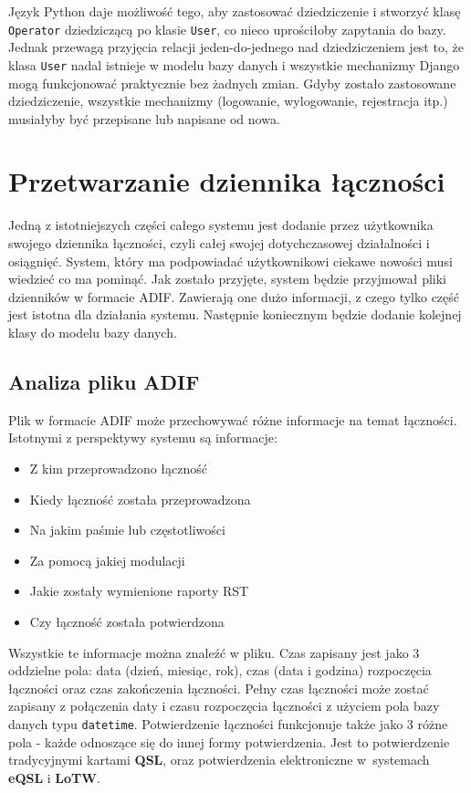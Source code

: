 \documentclass[]{mgr}
\begin{document}
            Język Python daje możliwość tego, aby zastosować dziedziczenie i stworzyć klasę \texttt{Operator} dziedziczącą po klasie \texttt{User}, co nieco uprościłoby zapytania do bazy. Jednak przewagą przyjęcia relacji jeden-do-jednego nad dziedziczeniem jest to, że klasa \texttt{User} nadal istnieje w modelu bazy danych i wszystkie mechanizmy Django mogą funkcjonować praktycznie bez żadnych zmian. Gdyby zostało zastosowane dziedziczenie, wszystkie mechanizmy (logowanie, wylogowanie, rejestracja itp.) musiałyby być przepisane lub napisane od nowa.

        \section{Przetwarzanie dziennika łączności}
        Jedną z istotniejszych części całego systemu jest dodanie przez użytkownika swojego dziennika łączności, czyli całej swojej dotychczasowej działalności i osiągnięć. System, który ma podpowiadać użytkownikowi ciekawe nowości musi wiedzieć co ma pominąć. Jak zostało przyjęte, system będzie przyjmował pliki dzienników w formacie ADIF. Zawierają one dużo informacji, z czego tylko część jest istotna dla działania systemu. Następnie koniecznym będzie dodanie kolejnej klasy do modelu bazy danych.

            \subsection{Analiza pliku ADIF}
            Plik w formacie ADIF może przechowywać różne informacje na temat łączności. Istotnymi z perspektywy systemu są informacje:
            \begin{itemize}
                \item Z kim przeprowadzono łączność
                \item Kiedy łączność została przeprowadzona
                \item Na jakim paśmie lub częstotliwości
                \item Za pomocą jakiej modulacji
                \item Jakie zostały wymienione raporty RST
                \item Czy łączność została potwierdzona
            \end{itemize}
            Wszystkie te informacje można znaleźć w pliku. Czas zapisany jest jako 3 oddzielne pola: data (dzień, miesiąc, rok), czas (data i godzina) rozpoczęcia łączności oraz czas zakończenia łączności. Pełny czas łączności może zostać zapisany z połączenia daty i czasu rozpoczęcia łączności z użyciem pola bazy danych typu \texttt{datetime}. Potwierdzenie łączności funkcjonuje także jako 3 różne pola - każde odnoszące się do innej formy potwierdzenia. Jest to potwierdzenie tradycyjnymi kartami \textbf{QSL}, oraz potwierdzenia elektroniczne w~systemach \textbf{eQSL} i \textbf{LoTW}.
\end{document}
